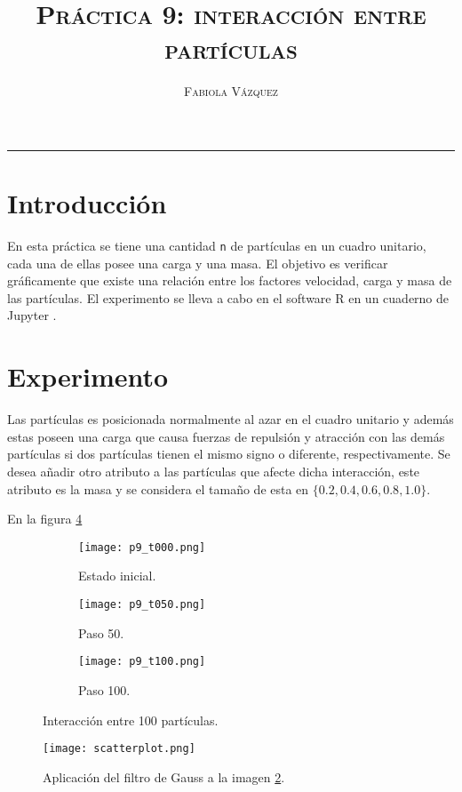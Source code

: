 \documentclass[12pt,letterpaper]{article}
\title{\textsc{Práctica 9: interacción entre partículas}}
\author{\textsc{Fabiola Vázquez}}
\begin{document}
\maketitle

\hrule
\section{Introducción}
En esta práctica \cite{elisapractica9} se tiene una cantidad \texttt{n} de partículas en un cuadro unitario, cada una de ellas posee una carga y una masa. El objetivo es verificar gráficamente que existe una relación entre los factores velocidad, carga y masa de las partículas. El experimento se lleva a cabo en el software R \cite{R} en un cuaderno de Jupyter \cite{jupyter}.

\section{Experimento}
Las partículas es posicionada normalmente al azar en el cuadro unitario y además estas poseen una carga que causa fuerzas de repulsión y atracción con las demás partículas si dos partículas tienen el mismo signo o diferente, respectivamente. Se desea añadir otro atributo a las partículas que afecte dicha interacción, este atributo es la masa y se considera el tamaño de esta en $\{0.2, 0.4, 0.6, 0.8, 1.0\}.$ 

En la figura \ref{im}
 \begin{figure}
 	\centering 
 	\begin{subfigure}[b]{0.3\linewidth}
 		\texttt{[image: p9\_t000.png]} 		
 		\caption{Estado inicial.}
 		 		\label{1}
 	\end{subfigure}  \hfill
 	\begin{subfigure}[b]{0.3\linewidth}
 		\texttt{[image: p9\_t050.png]} 		
 		\caption{Paso 50.}
 		\label{2}
 	\end{subfigure} \hfill
 	 	\begin{subfigure}[b]{0.3\linewidth}
 		\texttt{[image: p9\_t100.png]} 		
 		\caption{Paso 100.}
 		\label{3}
 	\end{subfigure}
 	 	\caption{Interacción entre 100 partículas.} 
 	 		\label{im}
\end{figure} 

\begin{figure}
\centering
\texttt{[image: scatterplot.png]} 		
 		\caption{Aplicación del filtro de Gauss a la imagen \ref{2}.}
 		\label{4}
\end{figure}
 

\end{document}
